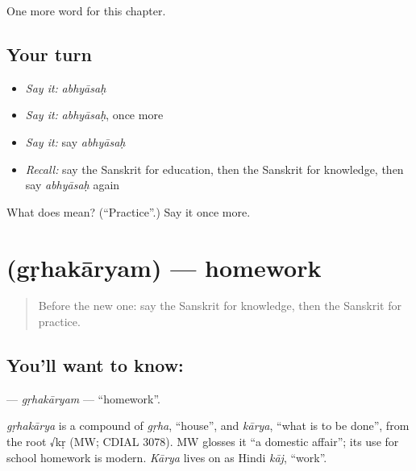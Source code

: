 \begin{grammarlens}[title={What you've built}]
One more word for this chapter.
\end{grammarlens}

\subsection*{Your turn}
\begin{itemize}
\raggedright
  \item \emph{Say it:} \emph{abhyāsaḥ}
  \item \emph{Say it:} \emph{abhyāsaḥ}, once more
  \item \emph{Say it:} say \emph{abhyāsaḥ}
  \item \emph{Recall:} say the Sanskrit for education, then the Sanskrit for knowledge, then say \emph{abhyāsaḥ} again
\end{itemize}

\begin{tcolorbox}[breakable,colback=teal!4,colframe=teal!35!black,title={Before you move on}]
What does  mean? (\textquotedblleft{}Practice\textquotedblright{}.) Say it once more.
\end{tcolorbox}
\section[\texorpdfstring{\sk{गृहकार्यम्} (gṛhakāryam)}{गृहकार्यम् (gṛhakāryam)}]{ (gṛhakāryam) — homework}

\label{lesson:SA-C255-grhakaryam}



\begin{quote}
Before the new one: say the Sanskrit for knowledge, then the Sanskrit for practice.
\end{quote}

\subsection*{You'll want to know: }
\textbf{} — \emph{gṛhakāryam} — \textquotedblleft{}homework\textquotedblright{}.

\begin{cousinweb}
\emph{gṛhakārya} is a compound of \emph{gṛha}, \textquotedblleft{}house\textquotedblright{}, and \emph{kārya}, \textquotedblleft{}what is to be done\textquotedblright{}, from the root √kṛ (MW; CDIAL 3078). MW glosses it \textquotedblleft{}a domestic affair\textquotedblright{}; its use for school homework is modern. \emph{Kārya} lives on as Hindi \emph{kāj}, \textquotedblleft{}work\textquotedblright{}.
\end{cousinweb}

